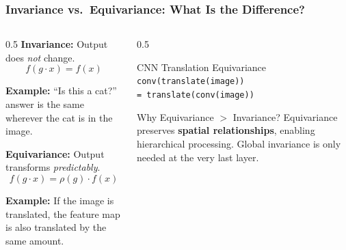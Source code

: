 \begin{frame}[fragile]\frametitle{Invariance vs.\ Equivariance: What Is the Difference?}

\begin{columns}
\begin{column}{0.5\textwidth}
\textbf{Invariance:} Output does \emph{not} change.
$$f(g \cdot x) = f(x)$$

\textbf{Example:} ``Is this a cat?'' answer is the same wherever the cat is in the image.

\vspace{0.4cm}
\textbf{Equivariance:} Output transforms \emph{predictably}.
$$f(g \cdot x) = \rho(g) \cdot f(x)$$

\textbf{Example:} If the image is translated, the feature map is also translated by the same amount.
\end{column}
\begin{column}{0.5\textwidth}
\begin{exampleblock}{CNN Translation Equivariance}
\texttt{conv(translate(image))}\\
\texttt{= translate(conv(image))}
\end{exampleblock}

\vspace{0.3cm}
\begin{alertblock}{Why Equivariance $>$ Invariance?}
Equivariance preserves \textbf{spatial relationships}, enabling hierarchical processing. Global invariance is only needed at the very last layer.
\end{alertblock}
\end{column}
\end{columns}

\end{frame}

